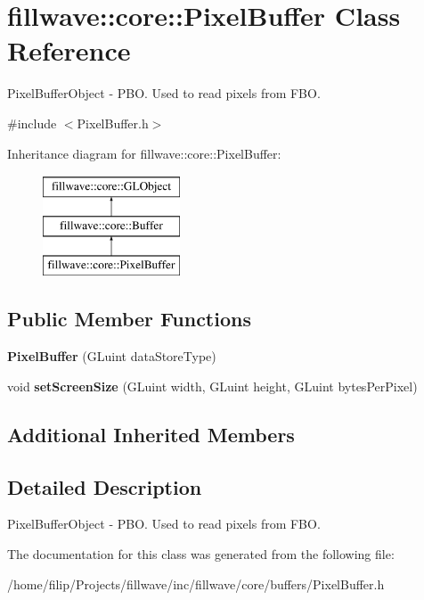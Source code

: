 \hypertarget{classfillwave_1_1core_1_1PixelBuffer}{}\section{fillwave\+:\+:core\+:\+:Pixel\+Buffer Class Reference}
\label{classfillwave_1_1core_1_1PixelBuffer}


Pixel\+Buffer\+Object -\/ P\+B\+O. Used to read pixels from F\+B\+O.  




{\ttfamily \#include $<$Pixel\+Buffer.\+h$>$}

Inheritance diagram for fillwave\+:\+:core\+:\+:Pixel\+Buffer\+:\begin{figure}[H]
\begin{center}
\leavevmode
\includegraphics[height=3.000000cm]{classfillwave_1_1core_1_1PixelBuffer}
\end{center}
\end{figure}
\subsection*{Public Member Functions}
\begin{DoxyCompactItemize}
\item 
\hypertarget{classfillwave_1_1core_1_1PixelBuffer_a871b59f08498c06d8734505a19baca21}{}{\bfseries Pixel\+Buffer} (G\+Luint data\+Store\+Type)\label{classfillwave_1_1core_1_1PixelBuffer_a871b59f08498c06d8734505a19baca21}

\item 
\hypertarget{classfillwave_1_1core_1_1PixelBuffer_a6b7dc23876d4f41849f5cbe6733f4046}{}void {\bfseries set\+Screen\+Size} (G\+Luint width, G\+Luint height, G\+Luint bytes\+Per\+Pixel)\label{classfillwave_1_1core_1_1PixelBuffer_a6b7dc23876d4f41849f5cbe6733f4046}

\end{DoxyCompactItemize}
\subsection*{Additional Inherited Members}


\subsection{Detailed Description}
Pixel\+Buffer\+Object -\/ P\+B\+O. Used to read pixels from F\+B\+O. 

The documentation for this class was generated from the following file\+:\begin{DoxyCompactItemize}
\item 
/home/filip/\+Projects/fillwave/inc/fillwave/core/buffers/Pixel\+Buffer.\+h\end{DoxyCompactItemize}
